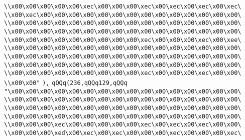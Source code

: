 \verb|\\x00\x00\x00\x00\x00\xec\x00\x00\x00\xec\x00\xec\x00\xec\x00\xec\|\newline
\verb|\\x00\xec\x00\x00\x00\x00\x00\x00\x00\x00\x00\x00\x00\x00\x00\x00\|\newline
\verb|\\x00\x00\x00\x00\x00\x00\x00\x00\x00\x00\x00\x00\x00\x00\x00\x00\|\newline
\verb|\\x00\x00\x00\x00\x00\x00\x00\x00\x00\x00\x00\x00\x00\x00\x00\x00\|\newline
\verb|\\x00\x00\x00\x00\x00\x00\x00\x00\x00\xec\x00\x00\x00\xec\x00\xee\|\newline
\verb|\\x00\x00\x00\x00\x00\x00\x00\x00\x00\x00\x00\x00\x00\x00\x00\x00\|\newline
\verb|\\x00\x00\x00\x00\x00\x00\x00\x00\x00\x00\x00\x00\x00\x00\x00\x00\|\newline
\verb|\\x00\x00\x00\x00\x00\x00\x00\x00\x00\x00\x00\x00\x00\x00\x00\x00\|\newline
\verb|\\x00\x00\x00\x00\x00\x00\x00\x00\x00\xec\x00\x00\x00\xec\x00\x00\|\newline
\verb|\\x00\x00"|\newline
\verb|),|\newline
\verb|qQQq(236,qQQq129,qQQq|\newline
\verb|"\x00\x00\x00\x00\x00\x00\x00\x00\x00\x00\x00\x00\x00\x00\x00\x00\|\newline
\verb|\\x00\x00\x00\x00\x00\x00\x00\x00\x00\x00\x00\x00\x00\x00\x00\x00\|\newline
\verb|\\x00\x00\x00\x00\x00\x00\x00\x00\x00\x00\x00\x00\x00\x00\x00\x00\|\newline
\verb|\\x00\x00\x00\x00\x00\x00\x00\x00\x00\x00\x00\x00\x00\x00\x00\x00\|\newline
\verb|\\x00\x00\x00\xec\x00\x00\x00\x00\x00\xec\x00\xec\x00\xec\x00\x00\|\newline
\verb|\\x00\x00\x00\xed\x00\xec\x00\xec\x00\x00\x00\xec\x00\x00\x00\xec\|\newline
